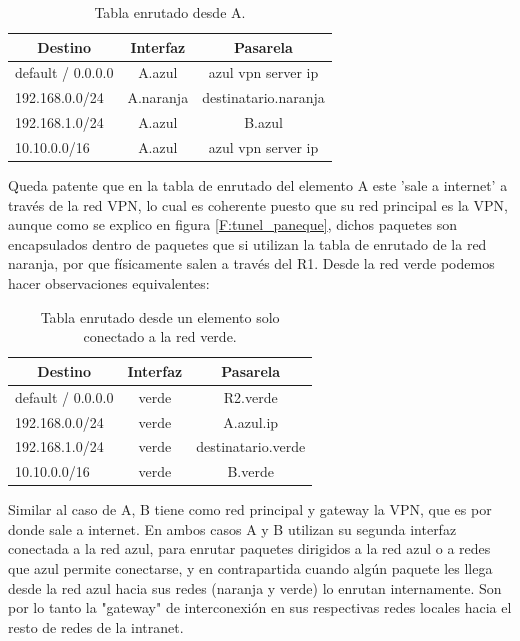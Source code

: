 \begin{table}[htb]
\begin{center}
\label{T:tabla_enrutado_A}
\caption{Tabla enrutado desde A.}
\begin{tabular}{|l|c|c|}
\hline \hline
\multicolumn{1}{|c|}{Destino} & Interfaz  & Pasarela           \\ \hline
default / 0.0.0.0             & A.azul    & azul vpn server ip \\ \hline
192.168.0.0/24                & A.naranja & destinatario.naranja     \\ \hline
192.168.1.0/24                & A.azul    & B.azul          \\ \hline
10.10.0.0/16                  & A.azul    & azul vpn server ip         \\ \hline
\end{tabular}
\end{center}
\end{table}

Queda patente que en la tabla de enrutado del elemento A este 'sale a internet' a través de la red VPN, lo cual es coherente puesto que su red principal es la VPN, aunque como se explico en figura \ref{F:tunel_paneque}, dichos paquetes son encapsulados dentro de paquetes que si utilizan la tabla de enrutado de la red naranja, por que físicamente salen a través del R1.
Desde la red verde podemos hacer observaciones equivalentes:

\begin{table}[htb]
\begin{center}
\label{T:tabla_enrutado_red_verde}
\caption{Tabla enrutado desde un elemento solo conectado a la red verde.}
\begin{tabular}{|l|c|c|}
\hline \hline
\multicolumn{1}{|c|}{Destino} & Interfaz  & Pasarela           \\ \hline
default / 0.0.0.0             & verde     & R2.verde \\ \hline
192.168.0.0/24                & verde     & A.azul.ip      \\ \hline
192.168.1.0/24                & verde     & destinatario.verde          \\ \hline
10.10.0.0/16                  & verde     & B.verde         \\ \hline
\end{tabular}
\end{center}
\end{table}

Similar al caso de A, B tiene como red principal y gateway la VPN, que es por donde sale a internet. En ambos casos A  y B utilizan su segunda interfaz conectada a la red azul, para enrutar paquetes dirigidos a la red azul o a redes que azul permite conectarse, y en contrapartida cuando algún paquete les llega desde la red azul hacia sus redes (naranja y verde) lo enrutan internamente. Son por lo tanto la "gateway" de interconexión en sus respectivas redes locales hacia el resto de redes de la intranet.


